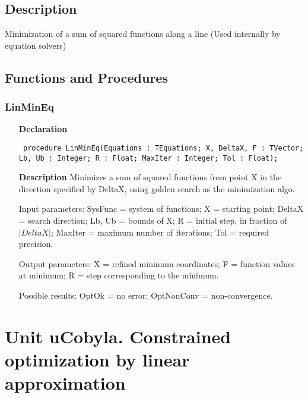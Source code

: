 \documentclass[12pt,a4paper,oneside]{report}
\newcommand{\lmatha}[1]{   %
	\marginpar{\vspace{#1} 
		\begin{flushright}
			LMath 0.5
	\end{flushright} }
}
\newcommand{\declarationitem}[1]{\textbf{#1}}
\newcommand{\descriptiontitle}[1]{\textbf{#1}}
\newcommand{\code}[1]{\texttt{#1}}
\begin{document}
\subsection{Description}
Minimization of a sum of squared functions along a line (Used internally by equation solvers) 
\subsection{Functions and Procedures}
\subsubsection{LinMinEq}
\label{ulinminq-LinMinEq}
\begin{itemize}\item[\declarationitem{Declaration}\hfill]
	\begin{flushleft}
		\code{
			procedure LinMinEq(Equations : TEquations; X, DeltaX, F : TVector; Lb, Ub : Integer; R : Float; MaxIter : Integer; Tol : Float);}
		
	\end{flushleft}
	
	\par
	\item[\descriptiontitle{Description}]
	Minimizes a sum of squared functions from point X in the direction specified by DeltaX, using golden search as the minimization algo.
	
	Input parameters: SysFunc = system of functions; X = starting point; DeltaX = search direction; Lb, Ub = bounds of X; R = initial step, in fraction of $|DeltaX|$; MaxIter = maximum number of iterations; Tol = required precision.
	
	Output parameters: X = refined minimum coordinates; F = function values at minimum; R = step corresponding to the minimum.
	
	Possible results: OptOk = no error; OptNonConv = non{-}convergence.
\end{itemize}

\section[unit uCobyla]{Unit uCobyla. Constrained optimization by linear approximation}\label{sec:unit-ucobyla}
\lmatha{-48pt}
\end{document}
